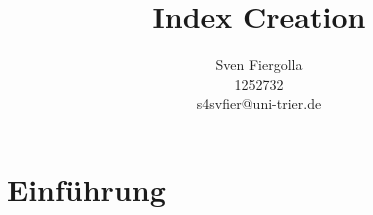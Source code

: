 

\author{Sven Fiergolla \\ 1252732 \\ s4svfier@uni-trier.de}
\title{Index Creation}


\maketitle

\section{Einführung}

\section{}


